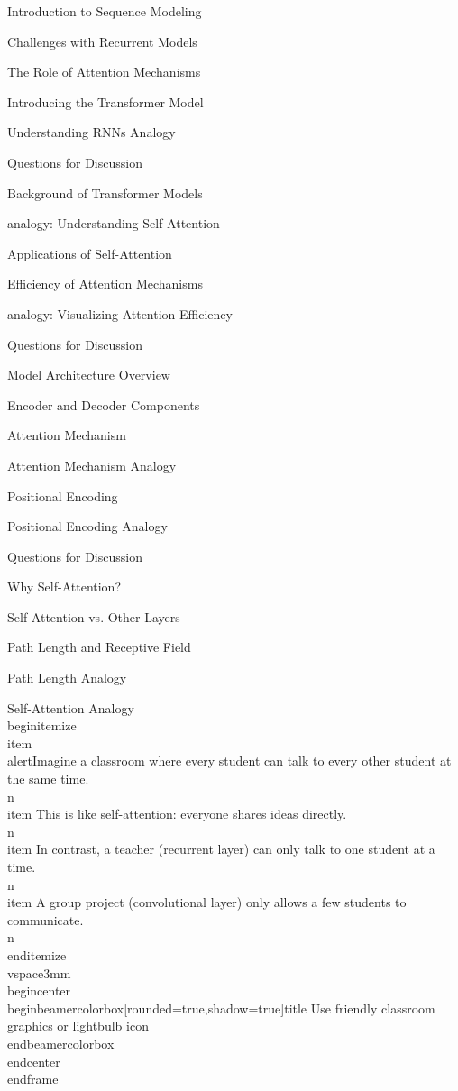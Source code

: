 \documentclass{beamer}
\begin{document}
\begin{frame}[]{Introduction to Sequence Modeling}
\begin{frame}[]{Challenges with Recurrent Models}
\begin{frame}[]{The Role of Attention Mechanisms}
\begin{frame}[]{Introducing the Transformer Model}
\begin{frame}[plain]{Understanding RNNs Analogy}
\begin{frame}[]{Questions for Discussion}
\begin{frame}[]{Background of Transformer Models}
\begin{frame}[plain]{analogy: Understanding Self-Attention}
\begin{frame}[]{Applications of Self-Attention}
\begin{frame}[]{Efficiency of Attention Mechanisms}
\begin{frame}[plain]{analogy: Visualizing Attention Efficiency}
\begin{frame}[]{Questions for Discussion}
\begin{frame}[]{Model Architecture Overview}
\begin{frame}[]{Encoder and Decoder Components}
\begin{frame}[]{Attention Mechanism}
\begin{frame}[plain]{Attention Mechanism Analogy}
\begin{frame}[]{Positional Encoding}
\begin{frame}[plain]{Positional Encoding Analogy}
\begin{frame}[]{Questions for Discussion}
\begin{frame}[]{Why Self-Attention?}
\begin{frame}[]{Self-Attention vs. Other Layers}
\begin{frame}[]{Path Length and Receptive Field}
\begin{frame}[plain]{Path Length Analogy}
\begingroup
{}\n{}\n\begin{frame}[plain]{Self-Attention Analogy}\n\\begin{itemize}
\\item \\alert{Imagine a classroom where every student can talk to every other student at the same time.}\\n\\item This is like self-attention: everyone shares ideas directly.\\n\\item In contrast, a teacher (recurrent layer) can only talk to one student at a time.\\n\\item A group project (convolutional layer) only allows a few students to communicate.\\n\\end{itemize}
\\vspace{3mm}
\\begin{center}
\\begin{beamercolorbox}[rounded=true,shadow=true]{title}
Use friendly classroom graphics or lightbulb icon
\\end{beamercolorbox}
\\end{center}
\\end{frame}

\endgroup


\end{frame}
\end{frame}
\end{frame}
\end{frame}
\end{frame}
\end{frame}
\end{frame}
\end{frame}
\end{frame}
\end{frame}
\end{frame}
\end{frame}
\end{frame}
\end{frame}
\end{frame}
\end{frame}
\end{frame}
\end{frame}
\end{frame}
\end{frame}
\end{frame}
\end{frame}
\end{frame}
\end{frame}
\end{document}
